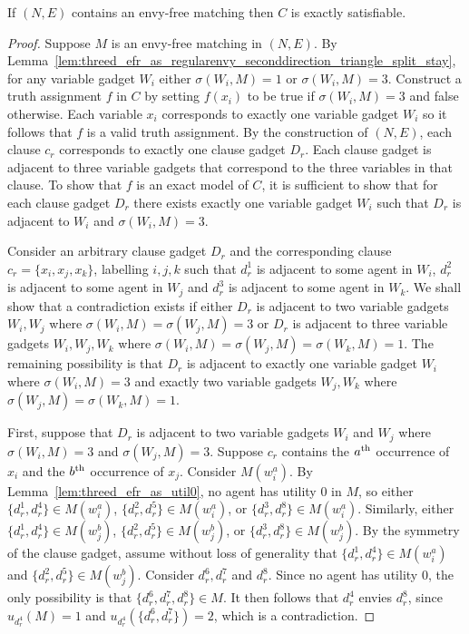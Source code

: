 \begin{lem}
\label{lem:threed_efr_as_regularenvy_seconddirection}
If $(N, E)$ contains an envy-free matching then $C$ is exactly satisfiable.
\end{lem}
\begin{proof}
Suppose $M$ is an envy-free matching in $(N, E)$. By Lemma~\ref{lem:threed_efr_as_regularenvy_seconddirection_triangle_split_stay}, for any variable gadget $W_i$ either $\sigma(W_i, M)=1$ or $\sigma(W_i, M)=3$. Construct a truth assignment $f$ in $C$ by setting $f(x_i)$ to be true if $\sigma(W_i, M)=3$ and false otherwise. Each variable $x_i$ corresponds to exactly one variable gadget $W_i$ so it follows that $f$ is a valid truth assignment. By the construction of $(N, E)$, each clause $c_r$ corresponds to exactly one clause gadget $D_r$. Each clause gadget is adjacent to three variable gadgets that correspond to the three variables in that clause. To show that $f$ is an exact model of $C$, it is sufficient to show that for each clause gadget $D_r$ there exists exactly one variable gadget $W_i$ such that $D_r$ is adjacent to $W_i$ and $\sigma(W_i, M)=3$.
 
Consider an arbitrary clause gadget $D_r$ and the corresponding clause $c_r=\{ x_i, x_j, x_k\}$, labelling $i, j, k$ such that $d_r^1$ is adjacent to some agent in $W_i$, $d_r^2$ is adjacent to some agent in $W_j$ and $d_r^3$ is adjacent to some agent in $W_k$. We shall show that a contradiction exists if either $D_r$ is adjacent to two variable gadgets $W_i, W_j$ where $\sigma(W_i, M)=\sigma(W_j, M)=3$ or $D_r$ is adjacent to three variable gadgets $W_i, W_j, W_k$ where $\sigma(W_i, M)=\sigma(W_j, M)=\sigma(W_k, M)=1$. The remaining possibility is that $D_r$ is adjacent to exactly one variable gadget $W_i$ where $\sigma(W_i, M)=3$ and exactly two variable gadgets $W_j, W_k$ where $\sigma(W_j, M)=\sigma(W_k, M)=1$.

First, suppose that $D_r$ is adjacent to two variable gadgets $W_{i}$ and $W_{j}$ where $\sigma(W_i, M)=3$ and $\sigma(W_j, M)=3$. Suppose $c_r$ contains the $a\textsuperscript{th}$ occurrence of $x_i$ and the $b\textsuperscript{th}$ occurrence of $x_j$. Consider $M(w_i^a)$. By Lemma~\ref{lem:threed_efr_as_util0}, no agent has utility $0$ in $M$, so either $\{ d_r^1, d_r^4 \} \in M(w_i^a)$, $\{ d_r^2, d_r^5 \} \in M(w_i^a)$, or $\{ d_r^3, d_r^8 \} \in M(w_i^a)$. Similarly, either $\{ d_r^1, d_r^4 \} \in M(w_j^b)$, $\{ d_r^2, d_r^5 \} \in M(w_j^b)$, or $\{ d_r^3, d_r^8 \} \in M(w_j^b)$. By the symmetry of the clause gadget, assume without loss of generality that $\{ d_r^1, d_r^4 \} \in M(w_i^a)$ and $\{ d_r^2, d_r^5 \} \in M(w_j^b)$. Consider $d_r^6, d_r^7$ and $d_r^8$. Since no agent has utility $0$, the only possibility is that $\{ d_r^6, d_r^7, d_r^8 \} \in M$. It then follows that $d_r^4$ envies $d_r^8$, since $u_{d_r^4}(M)=1$ and $u_{d_r^4}(\{ d_r^6, d_r^7 \})=2$, which is a contradiction.


\end{proof}
